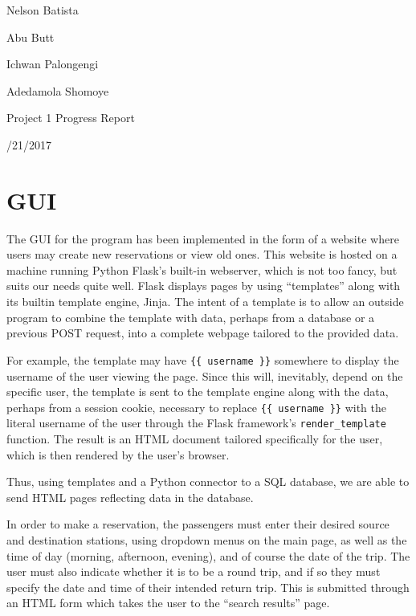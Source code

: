 \documentclass{article}
\begin{document}
\noindent Nelson Batista

\noindent Abu Butt

\noindent Ichwan Palongengi

\noindent Adedamola Shomoye

\noindent Project 1 Progress Report

/21/2017

\section{GUI}

The GUI for the program has been implemented in the form of a website where users may create new reservations or view old ones. This website is hosted on a machine running Python Flask's built-in webserver, which is not too fancy, but suits our needs quite well. Flask displays pages by using ``templates'' along with its builtin template engine, Jinja. The intent of a template is to allow an outside program to combine the template with data, perhaps from a database or a previous POST request, into a complete webpage tailored to the provided data. 

For example, the template may have \texttt{\{\{ username \}\}} somewhere to display the username of the user viewing the page. Since this will, inevitably, depend on the specific user, the template is sent to the template engine along with the data, perhaps from a session cookie, necessary to replace \texttt{\{\{ username \}\}} with the literal username of the user through the Flask framework's \texttt{render\_template} function. The result is an HTML document tailored specifically for the user, which is then rendered by the user's browser.

Thus, using templates and a Python connector to a SQL database, we are able to send HTML pages reflecting data in the database.

In order to make a reservation, the passengers must enter their desired source and destination stations, using dropdown menus on the main page, as well as the time of day (morning, afternoon, evening), and of course the date of the trip. The user must also indicate whether it is to be a round trip, and if so they must specify the date and time of their intended return trip. This is submitted through an HTML form which takes the user to the ``search results'' page.
\end{document}
